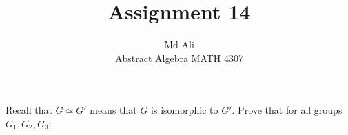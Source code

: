 \documentclass[12pt]{article}
\newenvironment{problem}[2][Problem]{\begin{trivlist}
\item[\hskip \labelsep {\bfseries #1}\hskip \labelsep {\bfseries #2.}]}{\end{trivlist}}
\begin{document}
 
 
\title{Assignment 14}%
\author{Md Ali\\ %
Abstract Algebra MATH 4307} %
 
\maketitle
 
\begin{problem}{2.5.2} %
Recall that $G \simeq G'$ means that $G$ is isomorphic to $G'$. Prove that for all groups $G_1,G_2,G_3$:
\end{problem}
 
\end{document}
